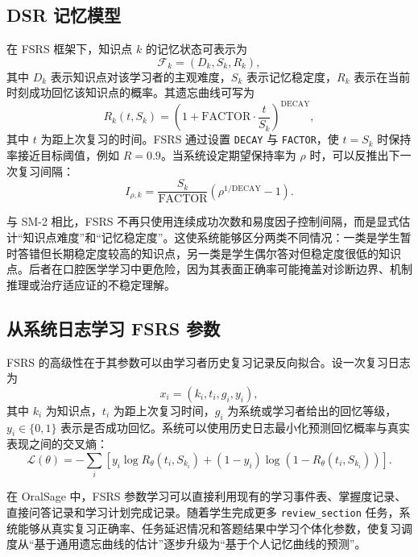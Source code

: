 \subsection{DSR 记忆模型}

在 FSRS 框架下，知识点 $k$ 的记忆状态可表示为
\begin{equation}
  \mathcal{F}_k=(D_k,S_k,R_k),
\end{equation}
其中 $D_k$ 表示知识点对该学习者的主观难度，$S_k$ 表示记忆稳定度，$R_k$ 表示在当前时刻成功回忆该知识点的概率。其遗忘曲线可写为
\begin{equation}
  R_k(t,S_k)=\left(1+\mathrm{FACTOR}\cdot\frac{t}{S_k}\right)^{\mathrm{DECAY}},
  \label{eq:fsrs-forgetting}
\end{equation}
其中 $t$ 为距上次复习的时间。FSRS 通过设置 \texttt{DECAY} 与 \texttt{FACTOR}，使 $t=S_k$ 时保持率接近目标阈值，例如 $R=0.9$。当系统设定期望保持率为 $\rho$ 时，可以反推出下一次复习间隔：
\begin{equation}
  I_{\rho,k}=
  \frac{S_k}{\mathrm{FACTOR}}
  \left(\rho^{1/\mathrm{DECAY}}-1\right).
  \label{eq:fsrs-interval}
\end{equation}

与 SM-2 相比，FSRS 不再只使用连续成功次数和易度因子控制间隔，而是显式估计“知识点难度”和“记忆稳定度”。这使系统能够区分两类不同情况：一类是学生暂时答错但长期稳定度较高的知识点，另一类是学生偶尔答对但稳定度很低的知识点。后者在口腔医学学习中更危险，因为其表面正确率可能掩盖对诊断边界、机制推理或治疗适应证的不稳定理解。

\subsection{从系统日志学习 FSRS 参数}

FSRS 的高级性在于其参数可以由学习者历史复习记录反向拟合。设一次复习日志为
\begin{equation}
  x_i=(k_i,t_i,g_i,y_i),
\end{equation}
其中 $k_i$ 为知识点，$t_i$ 为距上次复习时间，$g_i$ 为系统或学习者给出的回忆等级，$y_i\in\{0,1\}$ 表示是否成功回忆。系统可以使用历史日志最小化预测回忆概率与真实表现之间的交叉熵：
\begin{equation}
  \mathcal{L}(\theta)=
  -\sum_i
  \left[
  y_i\log R_{\theta}(t_i,S_{k_i})
  +(1-y_i)\log(1-R_{\theta}(t_i,S_{k_i}))
  \right].
  \label{eq:fsrs-loss}
\end{equation}

在 OralSage 中，FSRS 参数学习可以直接利用现有的学习事件表、掌握度记录、直接问答记录和学习计划完成记录。随着学生完成更多 \texttt{review\_section} 任务，系统能够从真实复习正确率、任务延迟情况和答题结果中学习个体化参数，使复习调度从“基于通用遗忘曲线的估计”逐步升级为“基于个人记忆曲线的预测”。

